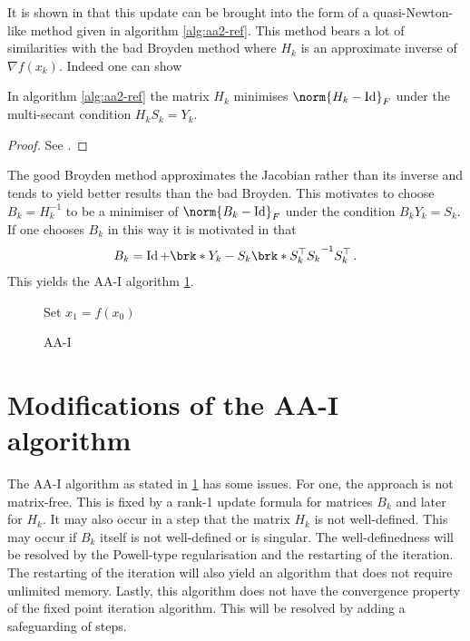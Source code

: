 It is shown in \cite[Section 2.2]{ZhaAA} that this update can be brought into the form of a quasi-Newton-like method given in algorithm \ref{alg:aa2-ref}. This method bears a lot of similarities with the bad Broyden method where $H_k$ is an approximate inverse of $\nabla f(x_k)$. Indeed one can show
\begin{proposition}
	In algorithm \ref{alg:aa2-ref} the matrix $H_k$ minimises $\norm{H_k-\Id}_F$ under the multi-secant condition $H_kS_k=Y_k$.
\end{proposition}
\begin{proof}
	See \cite[Section 2.2]{ZhaAA}.
\end{proof}
The good Broyden method approximates the Jacobian rather than its inverse and tends to yield better results than the bad Broyden. This motivates to choose  $B_k=H_k^{-1}$ to be a minimiser of $\norm{B_k-\Id}_F$ under the condition $B_kY_k=S_k$.
If one chooses $B_k$ in this way it is motivated in \cite[Section 2.3]{ZhaAA} that
\begin{align*}
	B_k = \Id+\brk*{Y_k-S_k}\brk*{S_k^\top S_k}^{-1}S_k^\top\,.
\end{align*}
This yields the AA-I algorithm \ref{alg:aa1}.

\begin{figure}
\centering
\begin{algorithm}[H]
\caption{AA-I}
\label{alg:aa1}

\BlankLine
Set $x_1=f(x_0)$

\end{algorithm}
\end{figure}

\newpage
\section{Modifications of the AA-I algorithm}

The AA-I algorithm as stated in \ref{alg:aa1} has some issues. For one, the approach is not matrix-free. This is fixed by a rank-1 update formula for matrices $B_k$ and later for $H_k$. It may also occur in a step that the matrix $H_k$ is not well-defined. This may occur if $B_k$ itself is not well-defined or is singular. The well-definedness will be resolved by the Powell-type regularisation and the restarting of the iteration. The restarting of the iteration will also yield an algorithm that does not require unlimited memory. Lastly, this algorithm does not have the convergence property of the fixed point iteration algorithm. This will be resolved by adding a safeguarding of steps.
	
